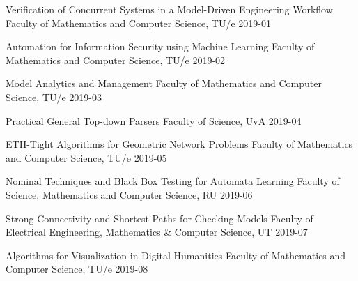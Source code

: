 \begin{multicols}{2}
%		 
%		 
%
%
%
%
         {Verification of Concurrent Systems in a Model-Driven Engineering Workflow}
         {Faculty of Mathematics and Computer Science, TU/e}
         {2019-01}

         {Automation for Information Security using Machine Learning}
         {Faculty of Mathematics and Computer Science, TU/e}
         {2019-02}

         {Model Analytics and Management}
         {Faculty of Mathematics and Computer Science, TU/e}
         {2019-03}

         {Practical General Top-down Parsers}
         {Faculty of Science, UvA}
         {2019-04}

         {ETH-Tight Algorithms for Geometric Network Problems}
         {Faculty of Mathematics and Computer Science, TU/e}
         {2019-05}

         {Nominal Techniques and Black Box Testing for Automata Learning}
         {Faculty of Science, Mathematics and Computer Science, RU}
         {2019-06}

         {Strong Connectivity and Shortest Paths for Checking Models}
         {Faculty of Electrical Engineering, Mathematics \& Computer Science, UT}
         {2019-07}

         {Algorithms for Visualization in Digital Humanities}
         {Faculty of Mathematics and Computer Science, TU/e}
         {2019-08}


\end{multicols}
